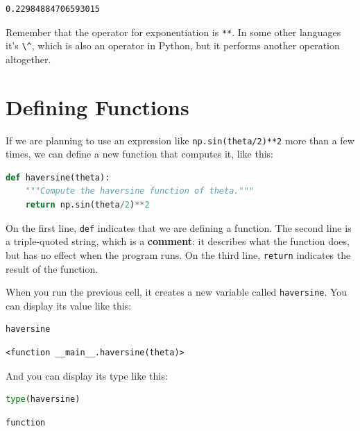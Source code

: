 \begin{lstlisting}[style=output]
0.22984884706593015
\end{lstlisting}

Remember that the operator for exponentiation is
\passthrough{\lstinline!**!}. In some other languages it's
\passthrough{\lstinline!\^!}, which is also an operator in Python, but
it performs another operation altogether.

\hypertarget{defining-functions}{%
\section{Defining Functions}\label{defining-functions}}

If we are planning to use an expression like
\passthrough{\lstinline!np.sin(theta/2)**2!} more than a few times, we
can define a new function that computes it, like this:

\begin{lstlisting}[language=Python,style=source]
def haversine(theta):
    """Compute the haversine function of theta."""
    return np.sin(theta/2)**2
\end{lstlisting}

On the first line, \passthrough{\lstinline!def!} indicates that we are
defining a function. The second line is a triple-quoted string, which is
a \textbf{comment}: it describes what the function does, but has no
effect when the program runs. On the third line,
\passthrough{\lstinline!return!} indicates the result of the function.

When you run the previous cell, it creates a new variable called
\passthrough{\lstinline!haversine!}. You can display its value like
this:

\begin{lstlisting}[language=Python,style=source]
haversine
\end{lstlisting}

\begin{lstlisting}[style=output]
<function __main__.haversine(theta)>
\end{lstlisting}

And you can display its type like this:

\begin{lstlisting}[language=Python,style=source]
type(haversine)
\end{lstlisting}

\begin{lstlisting}[style=output]
function
\end{lstlisting}

